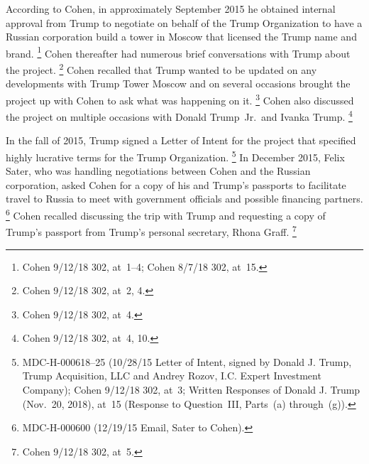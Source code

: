 {According to Cohen, in approximately September 2015 he obtained internal approval from Trump to negotiate on behalf of the Trump Organization to have a Russian corporation build a tower in Moscow that licensed the Trump name and brand.%
\footnote{Cohen 9/12/18 302, at~1--4;
Cohen 8/7/18 302, at~15.}
Cohen thereafter had numerous brief conversations with Trump about the project.%
\footnote{Cohen 9/12/18 302, at~2, 4.}
Cohen recalled that Trump wanted to be updated on any developments with Trump Tower Moscow and on several occasions brought the project up with Cohen to ask what was happening on it.%
\footnote{Cohen 9/12/18 302, at~4.}
Cohen also discussed the project on multiple occasions with Donald Trump~Jr.\ and Ivanka Trump.%
\footnote{Cohen 9/12/18 302, at~4, 10.}

In the fall of 2015, Trump signed a Letter of Intent for the project that specified highly lucrative terms for the Trump Organization.%
\footnote{MDC-H-000618--25 (10/28/15 Letter of Intent, signed by Donald J. Trump, Trump Acquisition, LLC and Andrey Rozov, I.C. Expert Investment Company);
Cohen 9/12/18 302, at~3;
Written Responses of Donald J. Trump (Nov.~20, 2018), at~15 (Response to Question~III, Parts~(a) through~(g)).}
In December 2015, Felix Sater, who was handling negotiations between Cohen and the Russian corporation, asked Cohen for a copy of his and Trump's passports to facilitate travel to Russia to meet with government officials and possible financing partners.%
\footnote{MDC-H-000600 (12/19/15 Email, Sater to Cohen).}
Cohen recalled discussing the trip with Trump and requesting a copy of Trump's passport from Trump's personal secretary, Rhona Graff.%
\footnote{Cohen 9/12/18 302, at~5.}

}
